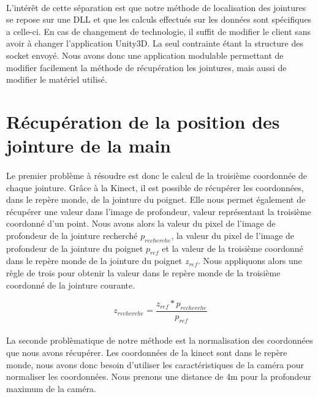 \paragraph{}
L'intérêt de cette séparation est que notre méthode de localisation des jointures se repose sur une 
DLL et que les calculs effectués sur les données sont spécifiques a celle-ci. En cas de changement de 
technologie, il suffit de modifier le client sans avoir à changer l'application Unity3D. La seul contrainte
étant la structure des socket envoyé. Nous avons donc une application modulable permettant de modifier 
facilement la méthode de récupération les jointures, mais aussi de modifier le matériel utilisé.

\section{Récupération de la position des jointure de la main}
\paragraph{}
Le premier problème à résoudre est donc le calcul de la troisième coordonnée de chaque jointure. Grâce à la Kinect,
il est possible de récupérer les coordonnées, dans le repère monde, de la jointure du poignet. Elle nous permet
également de récupérer une valeur dans l'image de profondeur, valeur représentant la troisième coordonné d'un point.
Nous avons alors la valeur du pixel de l'image de profondeur de la jointure recherché $p_{recherche}$, la valeur
du pixel de l'image de profondeur de la jointure du poignet $p_{ref}$ et la valeur de la troisième coordonné dans 
le repère monde de la jointure du poignet $z_{ref}$. Nous appliquons alors une règle de trois pour obtenir 
la valeur dans le repère monde de la troisième coordonné de la jointure courante.

\begin{equation}
 z_{recherche} = \frac{z_{ref} * p_{recherche}}{p_{ref}}
\end{equation}

\paragraph{}
La seconde problèmatique de notre méthode est la normalisation des coordonnées que nous avons récupérer. Les coordonnées
de la kinect sont dans le repère monde, nous avons donc besoin d'utiliser les caractéristiques de la caméra pour normaliser
les coordonnées. Nous prenons une distance de 4m pour la profondeur maximum de la caméra.

